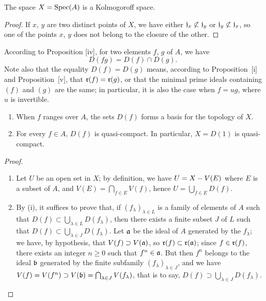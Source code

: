 \begin{cor}[1.1.8]
\label{1.1.1.8}
The space $X={\mathop{\mathrm{Spec}}\nolimits}(A)$ is a Kolmogoroff space.
\end{cor}

\begin{proof}
\label{proof-1.1.1.8}
If $x$, $y$ are two distinct points of $X$, we have either $\mathfrak{j}_x\not\subset\mathfrak{j}_y$ or $\mathfrak{j}_y\not\subset\mathfrak{j}_x$, so one of the points $x$, $y$ does not belong to the closure of the other.
\end{proof}

\begin{env}[1.1.9]
\label{1.1.1.9}
According to Proposition [iv], for two elements $f$, $g$ of $A$, we have
\[
  D(fg)=D(f)\cap D(g).
  \tag{1.1.9.1}
\]
Note also that the equality $D(f)=D(g)$ means, according to Proposition~[i] and Proposition~[v], that $\mathfrak{r}(f)=\mathfrak{r}(g)$, or that the minimal prime ideals containing $(f)$ and $(g)$ are the same;
in particular, it is also the case when $f=ug$, where $u$ is invertible.
\end{env}

\begin{prop}[1.1.10]
\label{1.1.1.10}
\medskip\noindent
{}
\begin{enumerate}[label=\emph{(\roman*)}]
  \item When $f$ ranges over $A$, the sets $D(f)$ forms a basis for the topology of $X$.
  \item For every $f\in A$, $D(f)$ is quasi-compact.
    In particular, $X=D(1)$ is quasi-compact.
\end{enumerate}
\end{prop}

\begin{proof}
\label{proof-1.1.1.10}
\medskip\noindent
\begin{enumerate}[label=(\roman*)]
  \item Let $U$ be an open set in $X$;
    by definition, we have $U=X- V(E)$ where $E$ is a subset of $A$, and $V(E)=\bigcap_{f\in E}V(f)$, hence $U=\bigcup_{f\in E}D(f)$.
  \item By (i), it suffices to prove that, if $(f_\lambda)_{\lambda\in L}$ is a family of elements of $A$ such that $D(f)\subset\bigcup_{\lambda\in L}D(f_\lambda)$, then there exists a finite subset $J$ of $L$ such that $D(f)\subset\bigcup_{\lambda\in J}D(f_\lambda)$.
    Let $\mathfrak{a}$ be the ideal of $A$ generated by the $f_\lambda$;
    we have, by hypothesis, that $V(f)\supset V(\mathfrak{a})$, so $\mathfrak{r}(f)\subset\mathfrak{r}(\mathfrak{a})$;
    since $f\in\mathfrak{r}(f)$, there exists an integer $n\geqslant 0$ such that $f^n\in\mathfrak{a}$.
    But then $f^n$ belongs to the ideal $\mathfrak{b}$ generated by the finite subfamily $(f_\lambda)_{\lambda\in J}$, and we have $V(f)=V(f^n)\supset V(\mathfrak{b})=\bigcap_{\lambda\in J}V(f_\lambda)$, that is to say, $D(f)\supset\bigcup_{\lambda\in J}D(f_\lambda)$.
\end{enumerate}
\end{proof}

